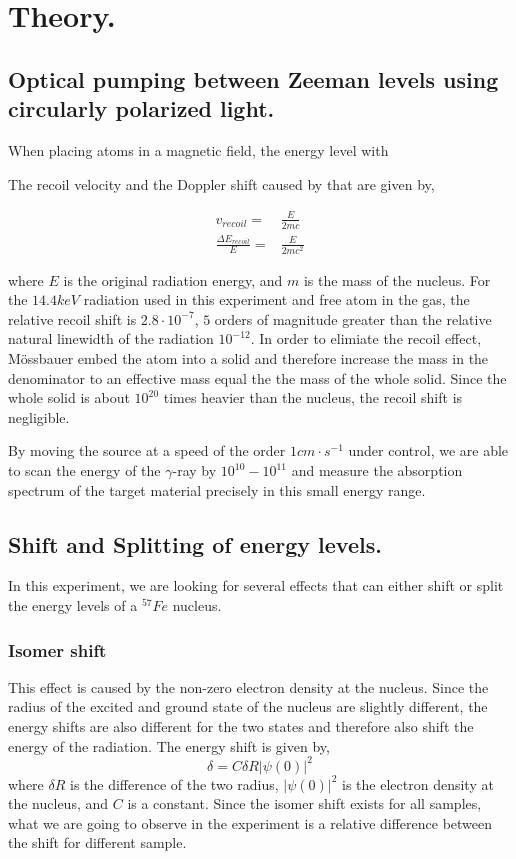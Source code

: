 \documentclass[aps,twocolumn,secnumarabic,balancelastpage,amsmath,amssymb,nofootinbib]{revtex4}
\newcommand{\eqar}[1]
{
  \begin{align*}
    #1
  \end{align*}
}
\newcommand{\dexp}[2]{\ensuremath{{#1}\cdot10^{#2}}}
\newcommand{\abs}[1]{{\left|{#1}\right|}}
\begin{document}
\section{Theory.}
\subsection{Optical pumping between Zeeman levels using circularly polarized light.}
When placing atoms in a magnetic field, the energy level with


The recoil velocity and the Doppler shift caused by that are given by,
\eqar{
  v_{recoil}=&\frac{E}{2mc}\\
  \frac{\Delta E_{recoil}}{E}=&\frac{E}{2mc^2}
}
where $E$ is the original radiation energy, and $m$ is the mass of the nucleus. For the $14.4keV$ radiation used in this experiment and free atom in the gas, the relative recoil shift is $\dexp{2.8}{-7}$, $5$ orders of magnitude greater than the relative natural linewidth of the radiation $10^{-12}$. In order to elimiate the recoil effect, M\"{o}ssbauer embed the atom into a solid and therefore increase the mass in the denominator to an effective mass equal the the mass of the whole solid. Since the whole solid is about $10^{20}$ times heavier than the nucleus, the recoil shift is negligible.

By moving the source at a speed of the order $1cm\cdot s^{-1}$ under control, we are able to scan the energy of the $\gamma$-ray by $10^{10}-10^{11}$ and measure the absorption spectrum of the target material precisely in this small energy range.

\subsection{Shift and Splitting of energy levels.}
In this experiment, we are looking for several effects that can either shift or split the energy levels of a ${}^{57}Fe$ nucleus.

\subsubsection{Isomer shift}
This effect is caused by the non-zero electron density at the nucleus. Since the radius of the excited and ground state of the nucleus are slightly different, the energy shifts are also different for the two states and therefore also shift the energy of the radiation. The energy shift is given by,
\[\delta = C\delta R\abs{\psi(0)}^2\]
where $\delta R$ is the difference of the two radius, $\abs{\psi(0)}^2$ is the electron density at the nucleus, and $C$ is a constant. Since the isomer shift exists for all samples, what we are going to observe in the experiment is a relative difference between the shift for different sample.
\end{document}
